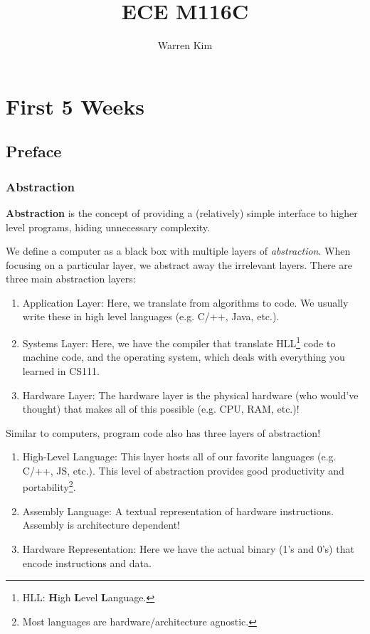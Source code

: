 \documentclass{report}
\title{ECE M116C}
\author{Warren Kim}
\date{}
\newcommand{\definition}[2]{\begin{tcolorbox}[title={Definition: #1}]{#2}\end{tcolorbox}}
\begin{document}
\maketitle

\tableofcontents
\newpage

\part{First 5 Weeks}
\chapter{Preface}
\section{Abstraction}
\definition{Abstraction}{
  \textbf{Abstraction} is the concept of providing a (relatively) simple interface to higher level
  programs, hiding unnecessary complexity.
}

We define a computer as a black box with multiple layers of \textit{abstraction}. When focusing on a
particular layer, we abstract away the irrelevant layers. There are three main abstraction layers:

\begin{enumerate}[label=\textit{(\roman*)}] 
\item Application Layer: Here, we translate from algorithms to code. We usually write these in high
  level languages (e.g. C/++, Java, etc.).
\item Systems Layer: Here, we have the compiler that translate HLL\footnote{HLL: \textbf{H}igh
    \textbf{L}evel \textbf{L}anguage.} code to machine code, and the operating system, which deals with
  everything you learned in CS111.
\item Hardware Layer: The hardware layer is the physical hardware (who would've thought) that makes
  all of this possible (e.g. CPU, RAM, etc.)!
\end{enumerate}
Similar to computers, program code also has three layers of abstraction!

\begin{enumerate}[label=\textit{(\roman*)}] 
\item High-Level Language: This layer hosts all of our favorite languages (e.g. C/++, JS,
  etc.). This level of abstraction provides good productivity and portability\footnote{Most
    languages are hardware/architecture agnostic.}. 
\item Assembly Language: A textual representation of hardware instructions. Assembly is architecture
  dependent!
\item Hardware Representation: Here we have the actual binary (1's and 0's) that encode instructions
  and data.  
\end{enumerate}
\end{document}
